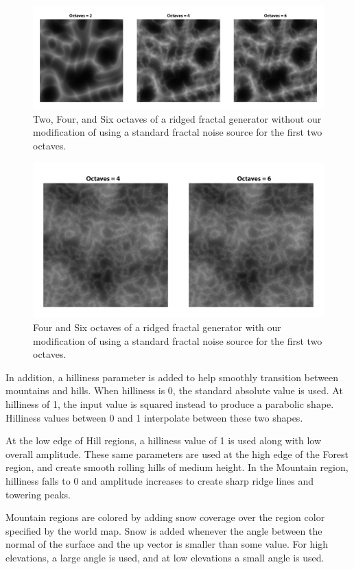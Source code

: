\begin{figure}
	\centering
		\includegraphics[width=1.0\textwidth]{figures/original_ridged}
	\caption{Two, Four, and Six octaves of a ridged fractal generator without our modification of using a standard fractal noise source for the first two octaves.}
	\label{fig:original_ridged}
\end{figure}

\begin{figure}
	\centering
		\includegraphics[width=1.0\textwidth]{figures/my_ridged}
	\caption{Four and Six octaves of a ridged fractal generator with our modification of using a standard fractal noise source for the first two octaves.}
	\label{fig:my_ridged}
\end{figure}

In addition, a hilliness parameter is added to help smoothly transition between mountains and hills.
When hilliness is 0, the standard absolute value is used.
At hilliness of 1, the input value is squared instead to produce a parabolic shape.
Hilliness values between 0 and 1 interpolate between these two shapes.

At the low edge of Hill regions, a hilliness value of 1 is used along with low overall amplitude.
These same parameters are used at the high edge of the Forest region, and create smooth rolling hills of medium height.
In the Mountain region, hilliness falls to 0 and amplitude increases to create sharp ridge lines and towering peaks.

Mountain regions are colored by adding snow coverage over the region color specified by the world map.
Snow is added whenever the angle between the normal of the surface and the up vector is smaller than some value.
For high elevations, a large angle is used, and at low elevations a small angle is used.

